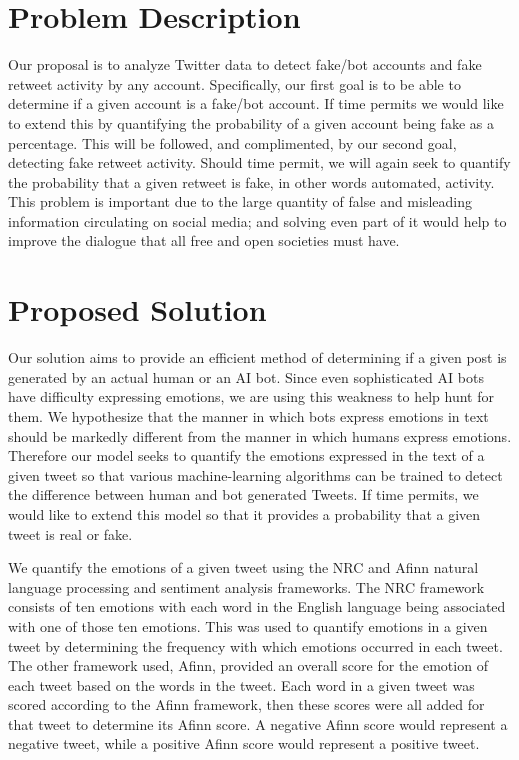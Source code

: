 \documentclass{article}[12pt]
\numberwithin{equation}{subsection}
\begin{document}
\begin{flushleft}


\section{Problem Description}

Our proposal is to analyze Twitter data to detect fake/bot accounts and fake retweet activity by any account.  Specifically, our first goal is to be able to determine if a given account is a fake/bot account. If time permits we would like to extend this by quantifying the probability of a given account being fake as a percentage.  This will be followed, and complimented, by our second goal, detecting fake retweet activity.  Should time permit, we will again seek to quantify the probability that a given retweet is fake, in other words automated, activity.  This problem is important due to the large quantity of false and misleading information circulating on social media; and solving even part of it would help to improve the dialogue that all free and open societies must have.


\section{Proposed Solution}

Our solution aims to provide an efficient method of determining if a given post is generated by an actual human or an AI bot.  Since even sophisticated AI bots have difficulty expressing emotions, we are using this weakness to help hunt for them.  We hypothesize that the manner in which bots express emotions in text should be markedly different from the manner in which humans express emotions.  Therefore our model seeks to quantify the emotions expressed in the text of a given tweet so that various machine-learning algorithms can be trained to detect the difference between human and bot generated Tweets.  If time permits, we would like to extend this model so that it provides a probability that a given tweet is real or fake. \newline

We quantify the emotions of a given tweet using the NRC and Afinn natural language processing and sentiment analysis frameworks.  The NRC framework consists of ten emotions with each word in the English language being associated with one of those ten emotions.  This was used to quantify emotions in a given tweet by determining the frequency with which emotions occurred in each tweet.  The other framework used, Afinn, provided an overall score for the emotion of each tweet based on the words in the tweet.  Each word in a given tweet was scored according to the Afinn framework, then these scores were all added for that tweet to determine its Afinn score.  A negative Afinn score would represent a negative tweet, while a positive Afinn score would represent a positive tweet. \newline


\end{flushleft}
\end{document}
